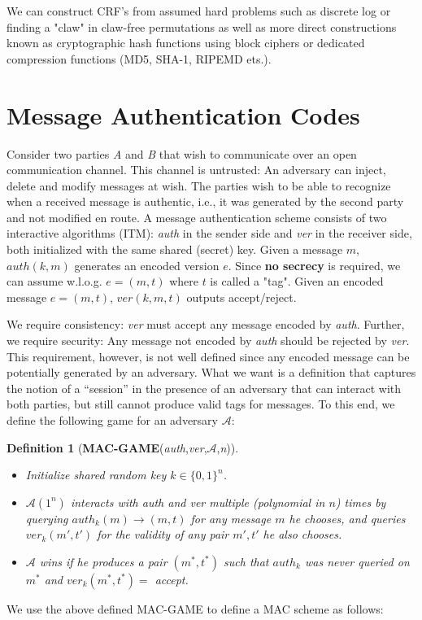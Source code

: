 \documentclass[12pt]{article}
\newcommand{\adv}{\mathcal{A}}
\newtheorem{definition}{Definition}[section]
\begin{document}
We can construct CRF's from assumed hard problems such as discrete log or finding a "claw" in claw-free permutations as well as more direct constructions known as cryptographic hash functions using block ciphers or dedicated compression functions (MD5, SHA-1, RIPEMD ets.). 

\section{Message Authentication Codes}
Consider two parties \textit{A} and \textit{B} that wish to communicate over an open communication channel. This channel is untrusted: An adversary can inject, delete and modify messages at wish. The parties wish to be able to recognize when a received message is authentic, i.e., it was generated by the second party and not modified en route. A message authentication scheme consists of two interactive algorithms (ITM): \textit{auth} in the sender side and \textit{ver} in the receiver side, both initialized with the same shared (secret) key. Given a message $m$, $auth(k,m)$ generates an encoded version $e$. Since \textbf{no secrecy} is required, we can assume w.l.o.g. $e = (m, t)$ where $t$ is called a "tag". Given an encoded message $e = (m, t)$, $ver(k, m, t)$ outputs accept/reject.

We require consistency: \textit{ver} must accept any message encoded by \textit{auth}. Further, we require security: Any message not encoded by \textit{auth} should be rejected by \textit{ver}. This requirement, however, is not well defined since any encoded message can be potentially generated by an adversary. What we want is a definition that captures the notion of a ``session'' in the presence of an adversary that can interact with both parties, but still cannot produce valid tags for messages. To this end, we define the following game for an adversary $\adv$:

\begin{definition}[\textbf{MAC-GAME}(\textit{auth},\textit{ver},$\adv$,\textit{n})]
\begin{itemize}
\item Initialize shared random key $k \in \{0, 1\}^n$.
\item $\adv(1^n)$ interacts with \textit{auth} and \textit{ver} multiple (polynomial in $n$) times by querying $auth_k(m) \rightarrow (m, t)$ for any message $m$ he chooses, and queries $ver_k(m', t')$ for the validity of any pair $m',t'$ he also chooses.
\item $\adv$ wins if he produces a pair $(m^*,t^*)$ such that $auth_k$ was never queried on $m^*$ and $ver_k(m^*,t^*) =$ accept.
\end{itemize}
\end{definition}
We use the above defined MAC-GAME to define a MAC scheme as follows:
\end{document}
